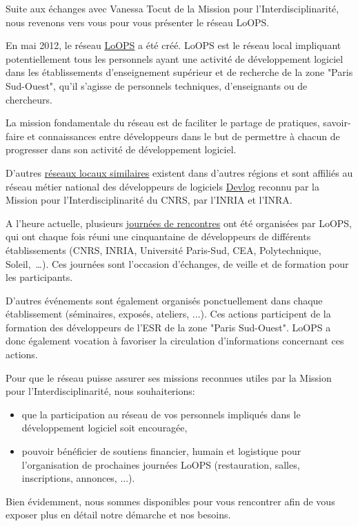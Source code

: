 Suite aux échanges avec Vanessa Tocut de la Mission pour
l'Interdisciplinarité, nous revenons vers vous pour vous
présenter le réseau LoOPS.

En mai 2012, le réseau \href{http://reseau-loops.github.io/}{LoOPS}
a été créé. LoOPS est le réseau local
impliquant potentiellement tous les personnels ayant une activité de
développement logiciel dans les établissements d'enseignement supérieur
et de recherche de la zone "Paris Sud-Ouest", qu'il s'agisse de personnels
techniques, d'enseignants ou de chercheurs.

La mission fondamentale du réseau est de faciliter le partage de pratiques,
savoir-faire et connaissances entre développeurs dans le but de permettre à
chacun de progresser dans son activité de développement logiciel.

D'autres \href{http://devlog.cnrs.fr/region}{réseaux locaux similaires} existent dans d'autres régions
et sont affiliés au réseau métier national des développeurs de logiciels
\href{http://devlog.cnrs.fr}{Devlog} reconnu par la Mission pour l'Interdisciplinarité
du CNRS, par l'INRIA et l'INRA.

A l'heure actuelle, plusieurs \href{http://reseau-loops.github.io/events.html}{journées de rencontres}
ont été organisées par LoOPS, qui ont chaque fois réuni une cinquantaine de développeurs de
différents établissements (CNRS, INRIA, Université Paris-Sud, CEA,
Polytechnique, Soleil,~\dots).
Ces journées sont l'occasion d'échanges, de veille et de
formation pour les participants.

D'autres événements sont également organisés ponctuellement dans chaque
établissement (séminaires, exposés, ateliers, ...). Ces actions participent
de la formation des développeurs de l'ESR de la zone "Paris Sud-Ouest". LoOPS
a donc également vocation à favoriser la circulation d'informations concernant
ces actions.

Pour que le réseau puisse assurer ses missions reconnues utiles par la Mission pour
l'Interdisciplinarité, nous souhaiterions:
\begin{itemize}
\item que la participation au réseau de vos personnels impliqués dans le
  développement logiciel soit encouragée,
\item pouvoir bénéficier de soutiens financier, humain et logistique pour
  l'organisation de prochaines journées LoOPS (restauration, salles,
  inscriptions, annonces, ...).
\end{itemize}

Bien évidemment, nous sommes disponibles pour vous rencontrer afin de vous
exposer plus en détail notre démarche et nos besoins.
